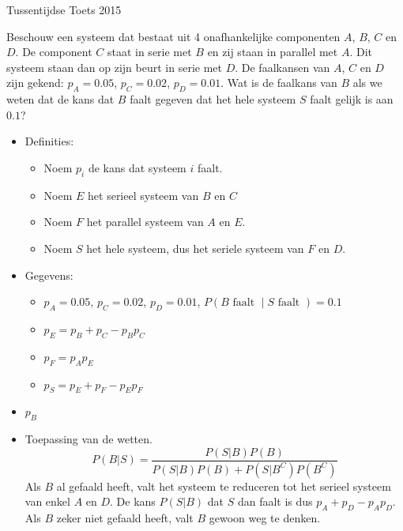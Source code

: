 \documentclass[main.tex]{subfiles}
\begin{document}
\begin{examenvraag}{Tussentijdse Toets 2015}
  \begin{ex-vraag}
    Beschouw een systeem dat bestaat uit 4 onafhankelijke componenten $A$, $B$, $C$ en $D$.
    De component $C$ staat in serie met $B$ en zij staan in parallel met $A$.
    Dit systeem staan dan op zijn beurt in serie met $D$.
    De faalkansen van $A$, $C$ en $D$ zijn gekend: $p_{A} = 0.05$, $p_{C}=0.02$, $p_{D}=0.01$.
    Wat is de faalkans van $B$ als we weten dat de kans dat $B$ faalt gegeven dat het hele systeem $S$ faalt gelijk is aan $0.1$?
  \end{ex-vraag}

  \begin{ex-antwoord}
    \begin{itemize}
    \item Definities:
      \begin{itemize}
      \item Noem $p_{i}$ de kans dat systeem $i$ faalt.
      \item Noem $E$ het serieel systeem van $B$ en $C$
      \item Noem $F$ het parallel systeem van $A$ en $E$.
      \item Noem $S$ het hele systeem, dus het seriele systeem van $F$ en $D$.
      \end{itemize}
    \item Gegevens:
      \begin{itemize}
      \item $p_{A} = 0.05$, $p_{C}=0.02$, $p_{D}=0.01$, $P(B \text{ faalt } \mid S \text{ faalt }) = 0.1$
      \item $p_{E} = p_{B} + p_{C} - p_{B}p_{C}$
      \item $p_{F} = p_{A}p_{E}$
      \item $p_{S} = p_{E} + p_{F} - p_{E}p_{F}$
      \end{itemize}
    \item $p_{B}$
    \item Toepassing van de wetten.\\
      \[ P(B|S) = \frac{P(S|B)P(B)}{P(S|B)P(B) + P(S|B^{C})P(B^{C})} \]
      Als $B$ al gefaald heeft, valt het systeem te reduceren tot het serieel systeem van enkel $A$ en $D$.
      De kans $P(S|B)$ dat $S$ dan faalt is dus $p_{A}+p_{D}-p_{A}p_{D}$.
      Als $B$ zeker niet gefaald heeft, valt $B$ gewoon weg te denken.

\end{itemize}
\end{ex-antwoord}
\end{examenvraag}
\end{document}
